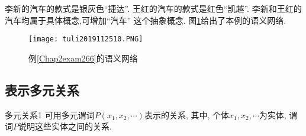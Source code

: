 \begin{example}\label{Chap2exam266}
    李新的汽车的款式是银灰色“捷达”.
    王红的汽车的款式是红色“凯越”.
    李新和王红的汽车均属于具体概念,可增加“汽车” 这个抽象概念.
    图\ref{AI32fig10}给出了本例的语义网络.
\end{example}
\begin{figure}[htbp]
\centering
\texttt{[image: tuli2019112510.PNG]}
\caption{例\ref{Chap2exam266}的语义网络}
\label{AI32fig10}
\end{figure}
\subsection{表示多元关系}
\begin{mydef}{多元关系}{1}
    可用多元谓词$P(x_1, x_2,\cdots)$表示的关系, 其中, 个体$x_1, x_2,\cdots$为实体, 谓词$P$说明这些实体之间的关系.
\end{mydef}

